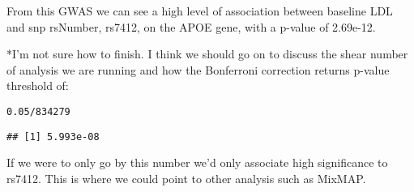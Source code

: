 \documentclass[11pt]{article}\usepackage[]{graphicx}\usepackage[]{color}
\makeatletter
\newcommand{\hlnum}[1]{\textcolor[rgb]{0.686,0.059,0.569}{#1}}%
\newcommand{\hlopt}[1]{\textcolor[rgb]{0,0,0}{#1}}%
\newenvironment{kframe}{%
 \def\at@end@of@kframe{}%
 \ifinner\ifhmode%
  \def\at@end@of@kframe{\end{minipage}}%
  \begin{minipage}{\columnwidth}%
 \fi\fi%
 \def\FrameCommand##1{\hskip\@totalleftmargin \hskip-\fboxsep
 \colorbox{shadecolor}{##1}\hskip-\fboxsep
     \hskip-\linewidth \hskip-\@totalleftmargin \hskip\columnwidth}%
 \MakeFramed {\advance\hsize-\width
   \@totalleftmargin\z@ \linewidth\hsize
   \@setminipage}}%
 {\par\unskip\endMakeFramed%
 \at@end@of@kframe}
\newenvironment{knitrout}{}{} %
\makeatother
\begin{document}

From this GWAS we can see a high level of association between baseline LDL and snp rsNumber, rs7412, on the APOE gene, with a p-value of 2.69e-12.

*I'm not sure how to finish.  I think we should go on to discuss the shear number of analysis we are running and how the Bonferroni correction returns p-value threshold of:
\begin{knitrout}
\color{fgcolor}\begin{kframe}
\begin{alltt}
\hlnum{0.05}\hlopt{/}\hlnum{834279}
\end{alltt}
\begin{verbatim}
## [1] 5.993e-08
\end{verbatim}
\end{kframe}
\end{knitrout}

If we were to only go by this number we'd only associate high significance to rs7412.  This is where we could point to other analysis such as MixMAP.
                                              
\end{document}
